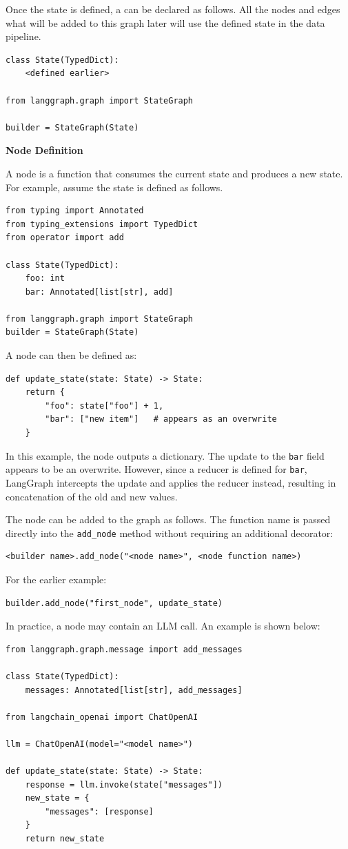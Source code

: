 Once the state is defined, a  can be declared as follows. All the nodes and edges what will be added to this graph later will use the defined state in the data pipeline.
\begin{lstlisting}
class State(TypedDict):
    <defined earlier>

from langgraph.graph import StateGraph

builder = StateGraph(State)
\end{lstlisting}

\vspace{0.1in}
\noindent \textbf{Node Definition}
\vspace{0.1in}

A node is a function that consumes the current state and produces a new state. For example, assume the state is defined as follows.
\begin{lstlisting}
from typing import Annotated
from typing_extensions import TypedDict
from operator import add

class State(TypedDict):
    foo: int
    bar: Annotated[list[str], add]

from langgraph.graph import StateGraph
builder = StateGraph(State)
\end{lstlisting}

A node can then be defined as:
\begin{lstlisting}
def update_state(state: State) -> State:
    return {
        "foo": state["foo"] + 1,
        "bar": ["new item"]   # appears as an overwrite
    }
\end{lstlisting}
In this example, the node outputs a dictionary. The update to the \texttt{bar} field appears to be an overwrite. However, since a reducer is defined for \texttt{bar}, LangGraph intercepts the update and applies the reducer instead, resulting in concatenation of the old and new values.

The node can be added to the graph as follows. The function name is passed directly into the \verb|add_node| method without requiring an additional decorator:
\begin{lstlisting}
<builder name>.add_node("<node name>", <node function name>)
\end{lstlisting}
For the earlier example:
\begin{lstlisting}
builder.add_node("first_node", update_state)
\end{lstlisting}

In practice, a node may contain an LLM call. An example is shown below:
\begin{lstlisting}
from langgraph.graph.message import add_messages

class State(TypedDict):
    messages: Annotated[list[str], add_messages]
    
from langchain_openai import ChatOpenAI

llm = ChatOpenAI(model="<model name>")

def update_state(state: State) -> State:
    response = llm.invoke(state["messages"])
    new_state = {
        "messages": [response]
    }
    return new_state
\end{lstlisting}

